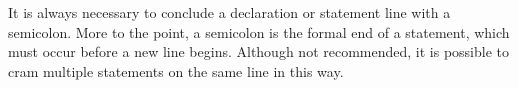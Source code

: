 It is always necessary to conclude a declaration or statement line with
a semicolon. More to the point, a semicolon is the formal end of a
statement, which must occur before a new line begins. Although not
recommended, it is possible to cram multiple statements on the same line
in this way.
